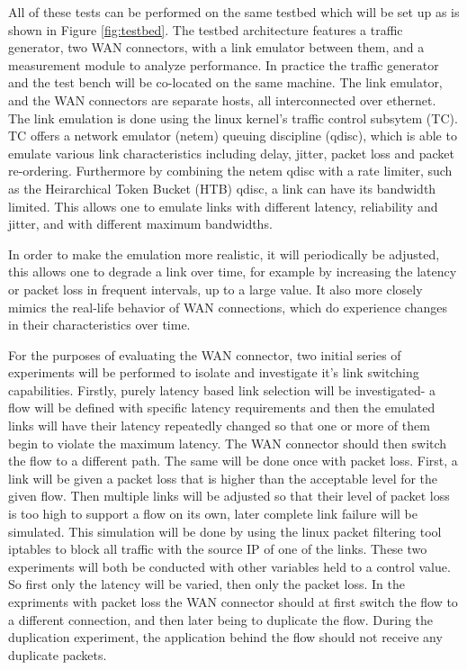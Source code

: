All of these tests can be performed on the same testbed which will be set up as is shown in Figure \ref{fig:testbed}. The testbed architecture features a traffic generator, two WAN connectors, with a link emulator between them, and a measurement module to analyze performance. In practice the traffic generator and the test bench will be co-located on the same machine. The link emulator, and the WAN connectors are separate hosts, all interconnected over ethernet. The link emulation is done using the linux kernel's traffic control subsytem (TC). TC offers a network emulator (netem) queuing discipline (qdisc), which is able to emulate various link characteristics including delay, jitter, packet loss and packet re-ordering. Furthermore by combining the netem qdisc with a rate limiter, such as the Heirarchical Token Bucket (HTB) qdisc, a link can have its bandwidth limited. This allows one to emulate links with different latency, reliability and jitter, and with different maximum bandwidths.

In order to make the emulation more realistic, it will periodically be adjusted, this allows one to degrade a link over time, for example by increasing the latency or packet loss in frequent intervals, up to a large value. It also more closely mimics the real-life behavior of WAN connections, which do experience changes in their characteristics over time.

For the purposes of evaluating the WAN connector, two initial series of experiments will be performed to isolate and investigate it's link switching capabilities. Firstly, purely latency based link selection will be investigated- a flow will be defined with specific latency requirements and then the emulated links will have their latency repeatedly changed so that one or more of them begin to violate the maximum latency. The WAN connector should then switch the flow to a different path. The same will be done once with packet loss. First, a  link will be given a packet loss that is higher than the acceptable level for the given flow. Then multiple links will be adjusted so that their level of packet loss is too high to support a flow on its own, later complete link failure will be simulated. This simulation will be done by using the linux packet filtering tool iptables to block all traffic with the source IP of one of the links. These two experiments will both be conducted with other variables held to a control value. So first only the latency will be varied, then only the packet loss. In the expriments with packet loss the WAN connector should at first switch the flow to a different connection, and then later being to duplicate the flow. During the duplication experiment, the application behind the flow should not receive any duplicate packets.

